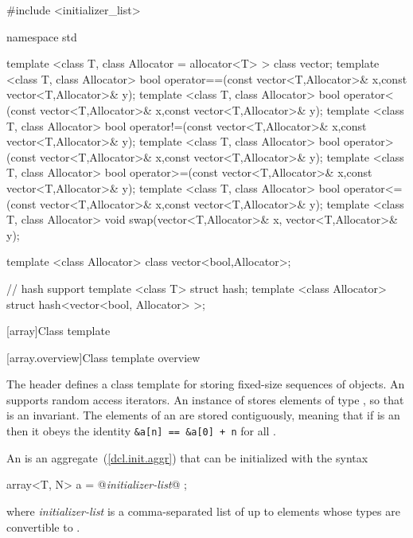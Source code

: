 \begin{codeblock}
#include <initializer_list>

namespace std {
  template <class T, class Allocator = allocator<T> > class vector;
  template <class T, class Allocator>
    bool operator==(const vector<T,Allocator>& x,const vector<T,Allocator>& y);
  template <class T, class Allocator>
    bool operator< (const vector<T,Allocator>& x,const vector<T,Allocator>& y);
  template <class T, class Allocator>
    bool operator!=(const vector<T,Allocator>& x,const vector<T,Allocator>& y);
  template <class T, class Allocator>
    bool operator> (const vector<T,Allocator>& x,const vector<T,Allocator>& y);
  template <class T, class Allocator>
    bool operator>=(const vector<T,Allocator>& x,const vector<T,Allocator>& y);
  template <class T, class Allocator>
    bool operator<=(const vector<T,Allocator>& x,const vector<T,Allocator>& y);
  template <class T, class Allocator>
    void swap(vector<T,Allocator>& x, vector<T,Allocator>& y);

  template <class Allocator> class vector<bool,Allocator>;

  // hash support
  template <class T> struct hash;
  template <class Allocator> struct hash<vector<bool, Allocator> >;
}
\end{codeblock}

[array]{Class template }
%

[array.overview]{Class template  overview}

\pnum
{}%
The header  defines a class template for storing fixed-size
sequences of objects. An  supports random access iterators. An
instance of  stores  elements of type , so that
 is an invariant. The elements of an  are stored contiguously,
meaning that if  is an  then it obeys the identity
\verb|&a[n] == &a[0] + n| for all .

\pnum
{}%
%
An  is an aggregate~(\ref{dcl.init.aggr}) that can be
initialized with the syntax
\begin{codeblock}
array<T, N> a = { @\textit{initializer-list}@ };
\end{codeblock}

where \textit{initializer-list} is a comma-separated list of up
to  elements whose types are convertible to .

